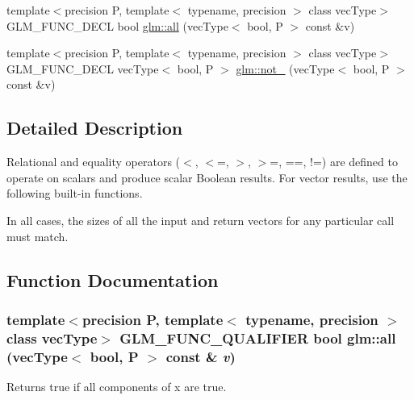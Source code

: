 \begin{CompactItemize}
\item 
{\footnotesize template$<$precision P, template$<$ typename, precision $>$ class vecType$>$ }\\GLM\_\-FUNC\_\-DECL bool \hyperlink{group__core__func__vector__relational_gabd60ec747e12c78e2d5c6e6c2ede230}{glm::all} (vecType$<$ bool, P $>$ const \&v)
\item 
{\footnotesize template$<$precision P, template$<$ typename, precision $>$ class vecType$>$ }\\GLM\_\-FUNC\_\-DECL vecType$<$ bool, P $>$ \hyperlink{group__core__func__vector__relational_g3f686b22d487d7d06447b15d3c621d2f}{glm::not\_\-} (vecType$<$ bool, P $>$ const \&v)
\end{CompactItemize}


\subsection{Detailed Description}
Relational and equality operators ($<$, $<$=, $>$, $>$=, ==, !=) are defined to operate on scalars and produce scalar Boolean results. For vector results, use the following built-in functions.

In all cases, the sizes of all the input and return vectors for any particular call must match. 

\subsection{Function Documentation}
\hypertarget{group__core__func__vector__relational_gabd60ec747e12c78e2d5c6e6c2ede230}{
\subsubsection[all]{\setlength{\rightskip}{0pt plus 5cm}template$<$precision P, template$<$ typename, precision $>$ class vecType$>$ GLM\_\-FUNC\_\-QUALIFIER bool glm::all (vecType$<$ bool, P $>$ const \& {\em v})}}
\label{group__core__func__vector__relational_gabd60ec747e12c78e2d5c6e6c2ede230}


Returns true if all components of x are true.

